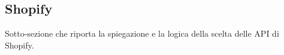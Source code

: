 \subsection{Shopify}

Sotto-sezione che riporta la spiegazione e la logica della scelta delle API di Shopify.